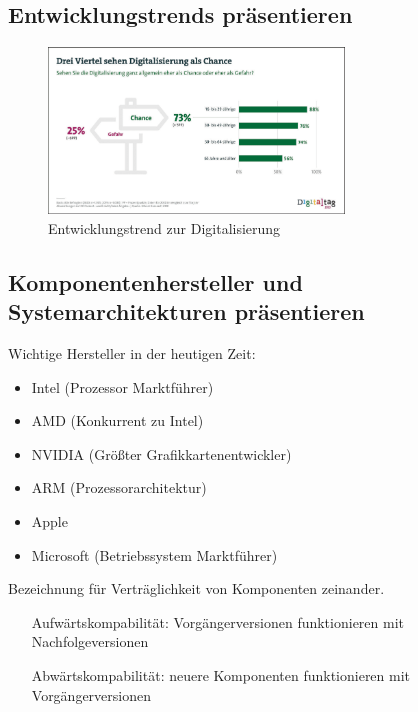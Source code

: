 \newpage
\subsection{Entwicklungstrends präsentieren}
    \vspace{-0.5em}
    \begin{figure}[h]
        \centering
        \includegraphics[width=0.7\textwidth]{./images/2.1.3_entwicklungstrend-digitalisierung.png}
        \caption{Entwicklungstrend zur Digitalisierung}\label{fig:Entwicklungstrend_Digitalisierung}
    \end{figure}
    \vspace{-0.5em}
\subsection{Komponentenhersteller und Systemarchitekturen präsentieren}
    \begin{subindent}
        Wichtige Hersteller in der heutigen Zeit:
    \end{subindent}
    \vspace{-0.5em}
    \begin{itemize}[leftmargin=2.5cm]
        \item Intel (Prozessor Marktführer)
        \item AMD (Konkurrent zu Intel)
        \item NVIDIA (Größter Grafikkartenentwickler)
        \item ARM (Prozessorarchitektur)
        \item Apple
        \item Microsoft (Betriebssystem Marktführer)
    \end{itemize}
    \vspace{0.5em}
    \begin{tcolorbox}[width=15cm, center, title=Kompatibilität, coltitle=white, colframe=white!20!blue, colback=white!80!blue]
        Bezeichnung für Verträglichkeit von Komponenten zeinander.
        \begin{itemize}[labelsep=1em, align=parleft, leftmargin=*, widest=Abwärtskompabilität, itemsep=0em]
            \item[Aufwärtskompabilität:] Vorgängerversionen funktionieren mit Nachfolgeversionen
            \item[Abwärtskompabilität: ] neuere Komponenten funktionieren mit Vorgängerversionen
        \end{itemize}
    \end{tcolorbox}

